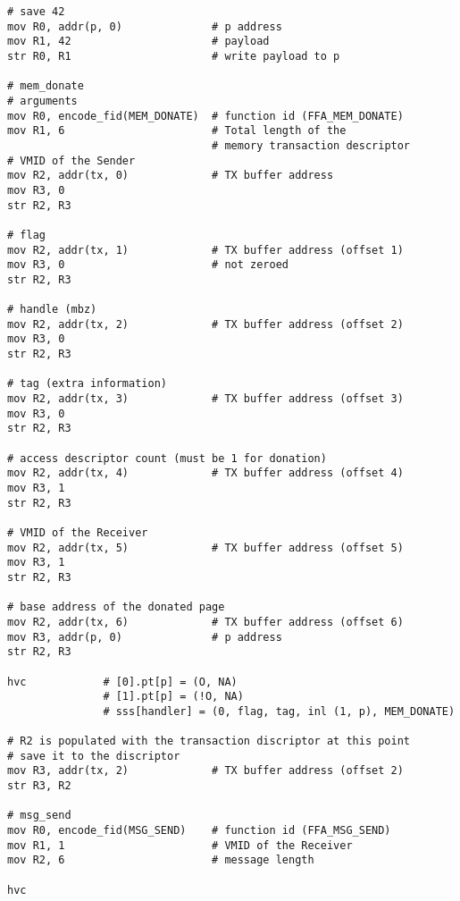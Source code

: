 \documentclass{article}
\begin{document}
\begin{lstlisting}[caption={VM 0}]
# save 42
mov R0, addr(p, 0)              # p address
mov R1, 42                      # payload
str R0, R1                      # write payload to p

# mem_donate
# arguments
mov R0, encode_fid(MEM_DONATE)  # function id (FFA_MEM_DONATE)
mov R1, 6                       # Total length of the  
                                # memory transaction descriptor
# VMID of the Sender 
mov R2, addr(tx, 0)             # TX buffer address                               
mov R3, 0
str R2, R3

# flag
mov R2, addr(tx, 1)             # TX buffer address (offset 1)                               
mov R3, 0                       # not zeroed
str R2, R3

# handle (mbz)
mov R2, addr(tx, 2)             # TX buffer address (offset 2)
mov R3, 0
str R2, R3

# tag (extra information)
mov R2, addr(tx, 3)             # TX buffer address (offset 3)
mov R3, 0
str R2, R3

# access descriptor count (must be 1 for donation)
mov R2, addr(tx, 4)             # TX buffer address (offset 4)
mov R3, 1
str R2, R3

# VMID of the Receiver
mov R2, addr(tx, 5)             # TX buffer address (offset 5)
mov R3, 1
str R2, R3

# base address of the donated page
mov R2, addr(tx, 6)             # TX buffer address (offset 6)
mov R3, addr(p, 0)              # p address
str R2, R3

hvc            # [0].pt[p] = (O, NA)
               # [1].pt[p] = (!O, NA)
               # sss[handler] = (0, flag, tag, inl (1, p), MEM_DONATE)

# R2 is populated with the transaction discriptor at this point
# save it to the discriptor
mov R3, addr(tx, 2)             # TX buffer address (offset 2)
str R3, R2

# msg_send
mov R0, encode_fid(MSG_SEND)    # function id (FFA_MSG_SEND)
mov R1, 1                       # VMID of the Receiver
mov R2, 6                       # message length

hvc
\end{lstlisting}
\end{document}
